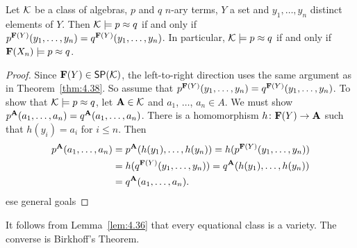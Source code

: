 \documentclass[12pt]{amsart}  %
\begin{document}
\begin{corollary}
  \label{cor:4.39} 
Let $\mathcal{K}$ be a class of algebras, $p$ and $q$ $n$-ary terms, $Y$ a set 
and $y_1, \dots, y_n$ distinct elements of $Y$. Then $\mathcal{K} \models p \approx q$ 
if and only if 
$p^{\mathbf{F}(Y)}(y_1, \dots, y_n) = q^{\mathbf{F}(Y)}(y_1, \dots, y_n)$.
In particular, $\mathcal{K} \models p \approx q$ if and only if 
$\mathbf{F}(X_n)\models p \approx q$.
\end{corollary}
\begin{proof}
Since $\mathbf{F}(Y)\in \mathsf{S}\mathsf{P}(\mathcal{K})$, the left-to-right 
direction uses the same argument as in Theorem~\ref{thm:4.38}. So assume 
that 
$p^{\mathbf{F}(Y)}(y_1, \dots, y_n) = q^{\mathbf{F}(Y)}(y_1, \dots, y_n)$.
To show that $\mathcal{K} \models p \approx q$, let 
$\mathbf{A} \in \mathcal{K}$ and $a_1$, $\dots$, $a_n \in A$. 
We must show $p^{\mathbf{A}}(a_1, \dots, a_n) = q^{\mathbf{A}}(a_1, \dots, a_n)$. 
There is a homomorphism $h\colon \mathbf{F}(Y) \to \mathbf{A}$ 
such that $h(y_i) = a_i$ for $i \leq n$. Then
\begin{align*}
 p^{\mathbf{A}}(a_1, \dots, a_n) &= p^{\mathbf{A}}(h (y_1), \dots, h (y_n))
= h(p^{\mathbf{F}(Y)}(y_1, \dots, y_n))\\
&= h(q^{\mathbf{F}(Y)}(y_1, \dots, y_n))
= q^{\mathbf{A}}(h(y_1), \dots, h(y_n))\\
&= q^{\mathbf{A}}(a_1, \dots, a_n).
\end{align*}
ese general goals 
\end{proof}

It follows from Lemma~\ref{lem:4.36} that every equational class is a variety. 
The converse is Birkhoff's Theorem.
\end{document}
